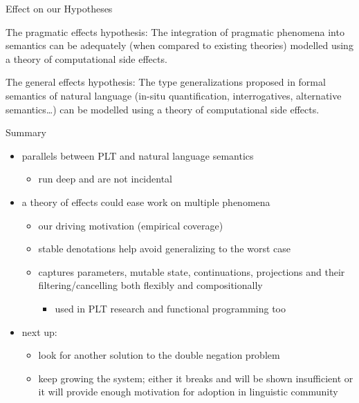 \documentclass{beamer}
\newcommand{\cmark}{\ding{51}}%
\newcommand{\xmark}{\ding{55}}%
\begin{document}
\begin{frame}{Effect on our Hypotheses}
  \begin{block}{The pragmatic effects hypothesis:}
  The integration of pragmatic phenomena into semantics can be adequately
  (when compared to existing theories) modelled using a theory of
  computational side effects.
  
  \uncover<2->{\begin{flushright}\textcolor{green}{\cmark}\end{flushright}}
  \end{block}
  \vfill
  \begin{block}{The general effects hypothesis:}
  The type generalizations proposed in formal semantics of natural language
  (in-situ quantification, interrogatives, alternative semantics\ldots) can
  be modelled using a theory of computational side effects.

  \uncover<3->{\begin{flushright}\textcolor{red}{\xmark}\end{flushright}}
  \end{block}
\end{frame}

\begin{frame}{Summary}
  \begin{itemize}
  \item parallels between PLT and natural language semantics
    \begin{itemize}
    \item run deep and are not incidental
    \end{itemize}
   \vfill
   \pause
  \item a theory of effects could ease work on multiple phenomena
    \begin{itemize}
    \item our driving motivation (empirical coverage)
    \item stable denotations help avoid generalizing to the worst case
    \item captures parameters, mutable state, continuations, projections
      and their filtering/cancelling both flexibly and compositionally
      \begin{itemize}
      \item used in PLT research and functional programming too
      \end{itemize}
    \end{itemize}
    \vfill
    \pause
  \item next up:
    \begin{itemize}
    \item look for another solution to the double negation problem
    \item keep growing the system; either it breaks and will be shown
      insufficient or it will provide enough motivation for adoption in
      linguistic community
    \end{itemize}
  \end{itemize}
\end{frame}
\end{document}
